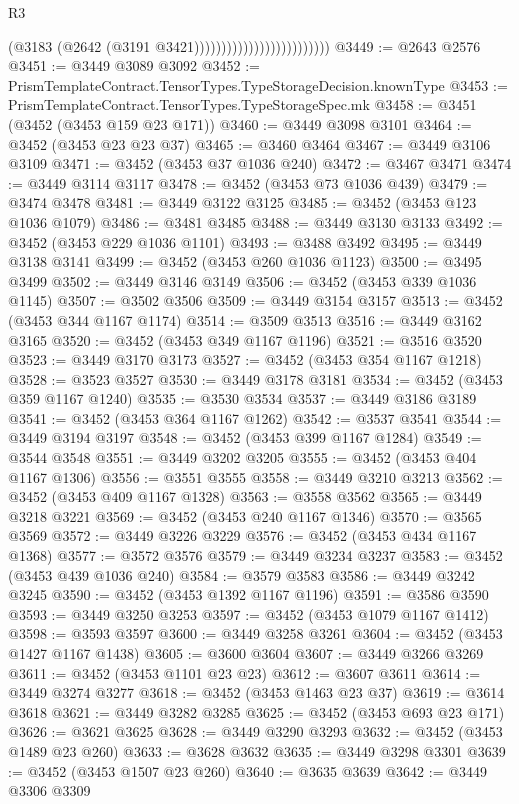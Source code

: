 \begin{lexlean}{R3}
\begin{coremodule}
                                                (@3183 (@2642 (@3191 @3421)))))))))))))))))))))))))
@3449 := @2643 @2576
@3451 := @3449 @3089 @3092
@3452 := PrismTemplateContract.TensorTypes.TypeStorageDecision.knownType
@3453 := PrismTemplateContract.TensorTypes.TypeStorageSpec.mk
@3458 := @3451 (@3452 (@3453 @159 @23 @171))
@3460 := @3449 @3098 @3101
@3464 := @3452 (@3453 @23 @23 @37)
@3465 := @3460 @3464
@3467 := @3449 @3106 @3109
@3471 := @3452 (@3453 @37 @1036 @240)
@3472 := @3467 @3471
@3474 := @3449 @3114 @3117
@3478 := @3452 (@3453 @73 @1036 @439)
@3479 := @3474 @3478
@3481 := @3449 @3122 @3125
@3485 := @3452 (@3453 @123 @1036 @1079)
@3486 := @3481 @3485
@3488 := @3449 @3130 @3133
@3492 := @3452 (@3453 @229 @1036 @1101)
@3493 := @3488 @3492
@3495 := @3449 @3138 @3141
@3499 := @3452 (@3453 @260 @1036 @1123)
@3500 := @3495 @3499
@3502 := @3449 @3146 @3149
@3506 := @3452 (@3453 @339 @1036 @1145)
@3507 := @3502 @3506
@3509 := @3449 @3154 @3157
@3513 := @3452 (@3453 @344 @1167 @1174)
@3514 := @3509 @3513
@3516 := @3449 @3162 @3165
@3520 := @3452 (@3453 @349 @1167 @1196)
@3521 := @3516 @3520
@3523 := @3449 @3170 @3173
@3527 := @3452 (@3453 @354 @1167 @1218)
@3528 := @3523 @3527
@3530 := @3449 @3178 @3181
@3534 := @3452 (@3453 @359 @1167 @1240)
@3535 := @3530 @3534
@3537 := @3449 @3186 @3189
@3541 := @3452 (@3453 @364 @1167 @1262)
@3542 := @3537 @3541
@3544 := @3449 @3194 @3197
@3548 := @3452 (@3453 @399 @1167 @1284)
@3549 := @3544 @3548
@3551 := @3449 @3202 @3205
@3555 := @3452 (@3453 @404 @1167 @1306)
@3556 := @3551 @3555
@3558 := @3449 @3210 @3213
@3562 := @3452 (@3453 @409 @1167 @1328)
@3563 := @3558 @3562
@3565 := @3449 @3218 @3221
@3569 := @3452 (@3453 @240 @1167 @1346)
@3570 := @3565 @3569
@3572 := @3449 @3226 @3229
@3576 := @3452 (@3453 @434 @1167 @1368)
@3577 := @3572 @3576
@3579 := @3449 @3234 @3237
@3583 := @3452 (@3453 @439 @1036 @240)
@3584 := @3579 @3583
@3586 := @3449 @3242 @3245
@3590 := @3452 (@3453 @1392 @1167 @1196)
@3591 := @3586 @3590
@3593 := @3449 @3250 @3253
@3597 := @3452 (@3453 @1079 @1167 @1412)
@3598 := @3593 @3597
@3600 := @3449 @3258 @3261
@3604 := @3452 (@3453 @1427 @1167 @1438)
@3605 := @3600 @3604
@3607 := @3449 @3266 @3269
@3611 := @3452 (@3453 @1101 @23 @23)
@3612 := @3607 @3611
@3614 := @3449 @3274 @3277
@3618 := @3452 (@3453 @1463 @23 @37)
@3619 := @3614 @3618
@3621 := @3449 @3282 @3285
@3625 := @3452 (@3453 @693 @23 @171)
@3626 := @3621 @3625
@3628 := @3449 @3290 @3293
@3632 := @3452 (@3453 @1489 @23 @260)
@3633 := @3628 @3632
@3635 := @3449 @3298 @3301
@3639 := @3452 (@3453 @1507 @23 @260)
@3640 := @3635 @3639
@3642 := @3449 @3306 @3309

\end{coremodule}
\end{lexlean}
